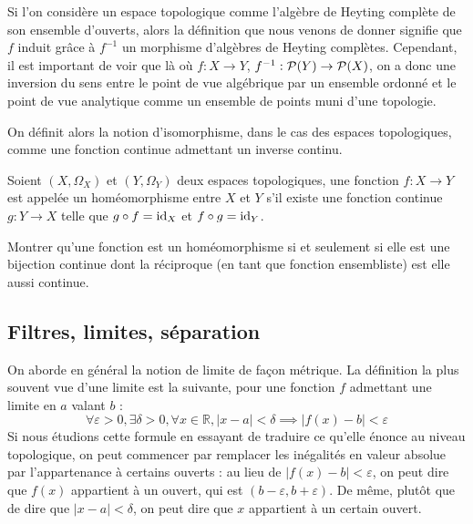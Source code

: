 \begin{remark}
  Si l'on considère un espace topologique comme l'algèbre de Heyting complète de
  son ensemble d'ouverts, alors la définition que nous venons de donner signifie
  que $f$ induit grâce à $f^{-1}$ un morphisme d'algèbres de Heyting complètes.
  Cependant, il est important de voir que là où $f : X \to Y$,
  $f^{-1} : \mathcal{P}(Y)\to\mathcal{P}(X)$, on a donc une inversion du sens entre
  le point de vue algébrique par un ensemble ordonné et le point de vue
  analytique comme un ensemble de points muni d'une topologie.
\end{remark}

On définit alors la notion d'isomorphisme, dans le cas des espaces topologiques,
comme une fonction continue admettant un inverse continu.

\begin{definition}[Homéomorphisme]
  Soient $(X,\Omega_X)$ et $(Y,\Omega_Y)$ deux espaces topologiques, une
  fonction $f : X \to Y$ est appelée un homéomorphisme entre $X$ et $Y$ s'il
  existe une fonction continue $g : Y \to X$ telle que $g\circ f = \operatorname{id}_X$ et
  $f\circ g = \operatorname{id}_Y$.
\end{definition}

\begin{exercise}
  Montrer qu'une fonction est un homéomorphisme si et seulement si elle est
  une bijection continue dont la réciproque (en tant que fonction ensembliste)
  est elle aussi continue.
\end{exercise}

\subsection{Filtres, limites, séparation}

On aborde en général la notion de limite de façon métrique. La définition la
plus souvent vue d'une limite est la suivante, pour une fonction $f$ admettant
une limite en $a$ valant $b$ :
\[\forall \varepsilon > 0, \exists \delta > 0, \forall x \in \mathbb R,
|x - a| < \delta \implies |f(x) - b| < \varepsilon\]
Si nous étudions cette formule en essayant de traduire ce qu'elle énonce au
niveau topologique, on peut commencer par remplacer les inégalités en valeur
absolue par l'appartenance à certains ouverts : au lieu de
$|f(x) - b| < \varepsilon$, on peut dire que $f(x)$ appartient à un
ouvert, qui est $(b-\varepsilon,b+\varepsilon)$. De même, plutôt que de dire
que $|x - a| < \delta$, on peut dire que $x$ appartient à un certain ouvert.

